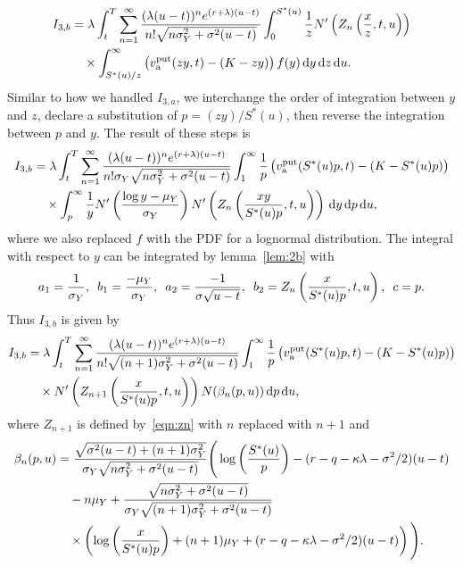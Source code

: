 		\begin{align*}
			I_{3,b} &= \lambda \int_t^T \displaystyle\sum\limits_{n=1}^{\infty} \frac{(\lambda(u-t))^ne^{(r+\lambda)(u-t)}}{n!\sqrt{n\sigma_Y^2 + \sigma^2(u-t)}}\int_0^{S^*(u)} \frac{1}{z}  N'\left( Z_n\left( \frac{x}{z},t, u \right) \right) \\
			&\quad {} \times \int_{S^*(u)/z}^\infty \left( v_{\text{a}}^{\text{put}}(zy,t) - (K-zy) \right) f(y) \, \mathrm d y  \, \mathrm d z \, \mathrm d u.
		\end{align*}
		Similar to how we handled $I_{3,a}$, we interchange the order of integration between $y$ and $z$, declare a substitution of $p = (zy)/S^*(u)$, then reverse the integration between $p$ and $y$. The result of these steps is
		\begin{align*}
			I_{3,b} &= \lambda \int_t^T \displaystyle\sum\limits_{n=1}^{\infty} \frac{(\lambda(u-t))^ne^{(r+\lambda)(u-t)}}{n!\sigma_Y\sqrt{n\sigma_Y^2 + \sigma^2(u-t)}}\int_1^\infty \frac{1}{p}\left( v_{\text{a}}^{\text{put}}(S^*(u)p,t) - (K-S^*(u)p) \right) \\
			&\quad {} \times \int_p^\infty \frac{1}{y} N'\left( \frac{\log y - \mu_Y}{\sigma_Y} \right) N'\left( Z_n\left( \frac{xy}{S^*(u)p}, t, u \right) \right)\, \mathrm d y  \, \mathrm d p \, \mathrm d u,
		\end{align*}
		where we also replaced $f$ with the PDF for a lognormal distribution. The integral with respect to $y$ can be integrated by lemma~\ref{lem:2b} with
		$$
			a_1 = \frac{1}{\sigma_Y}, \enskip b_1 = \frac{-\mu_Y}{\sigma_Y}, \enskip a_2 = \frac{-1}{\sigma\sqrt{u-t}}, \enskip
			b_2 = Z_n\left( \frac{x}{S^*(u)p}, t, u \right), \enskip c = p.
		$$
		Thus $I_{3,b}$ is given by
		\begin{align*}
			I_{3,b} &= \lambda \int_t^T \displaystyle\sum\limits_{n=1}^{\infty} \frac{(\lambda(u-t))^ne^{(r+\lambda)(u-t)}}{n!\sqrt{(n+1)\sigma_Y^2 + \sigma^2(u-t)}}\int_1^\infty \frac{1}{p}\left( v_{\text{a}}^{\text{put}}(S^*(u)p,t) - (K-S^*(u)p) \right) \\
			&\quad {} \times N'\left( Z_{n+1}\left( \frac{x}{S^*(u)p}, t, u \right)\right)N(\beta_n(p,u))  \, \mathrm d p \, \mathrm d u,
		\end{align*}
		where $Z_{n+1}$ is defined by~\eqref{eqn:zn} with $n$ replaced with $n+1$ and
		\begin{equation}
			\label{eqn:betan}
			\begin{split}
			\beta_n(p,u) &= \frac{\sqrt{\sigma^2(u-t) + (n+1)\sigma_Y^2}}{\sigma_Y\sqrt{n\sigma_Y^2 + \sigma^2(u-t)}}\Bigg( \log\left(\frac{S^*(u)}{p}\right) - (r-q-\kappa\lambda-\sigma^2/2)(u-t) \\
			&\quad {}  - n\mu_Y + \frac{\sqrt{n\sigma_Y^2 + \sigma^2(u-t)}}{\sigma_Y\sqrt{(n+1)\sigma_Y^2 + \sigma^2(u-t)}} \\ 
			&\quad {} \times \left(\log\left(\frac{x}{S^*(u)p}\right) + (n+1)\mu_Y + (r-q-\kappa\lambda - \sigma^2/2)(u-t)\right) \Bigg).
			\end{split}
		\end{equation}
